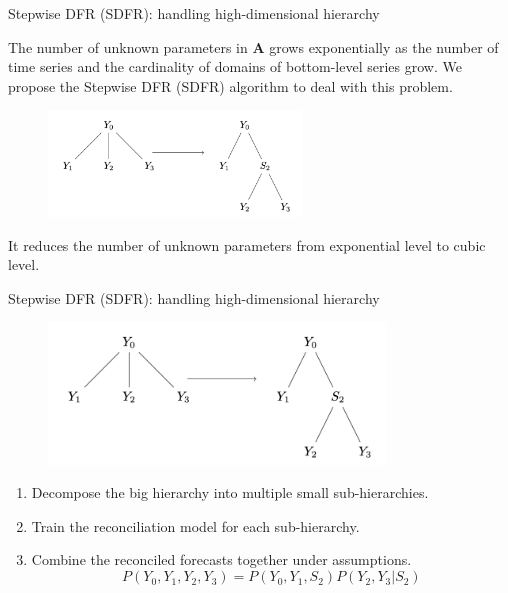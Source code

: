 \documentclass[12pt]{beamer}
\begin{document}
\begin{frame}{Stepwise DFR (SDFR): handling high-dimensional hierarchy}
    \begin{outline}
    \1 The number of unknown parameters in $\mathbf{A}$ grows exponentially as the number of time series and the cardinality of domains of bottom-level series grow.
    \1 We propose the Stepwise DFR (SDFR) algorithm to deal with this problem.    
    \begin{figure}
    \centering
    \includegraphics[width=0.6\textwidth]{figures/sdfr.png}    
    \end{figure}

    \1 It reduces the number of unknown parameters from exponential level to cubic level.
    \end{outline}
    
\end{frame}


\begin{frame}{Stepwise DFR (SDFR): handling high-dimensional hierarchy}
    \begin{figure}
        \centering
        \includegraphics[width=0.8\textwidth]{figures/sdfr.png}    
    \end{figure}

\begin{enumerate}
    \item Decompose the big hierarchy into multiple small sub-hierarchies.
    \item Train the reconciliation model for each sub-hierarchy.
    \item Combine the reconciled forecasts together under assumptions.
    \[
      P(Y_0, Y_1, Y_2, Y_3) = P(Y_0, Y_1, S_2) P(Y_2, Y_3|S_2)  
    \]
\end{enumerate}
\end{frame}
\end{document}
